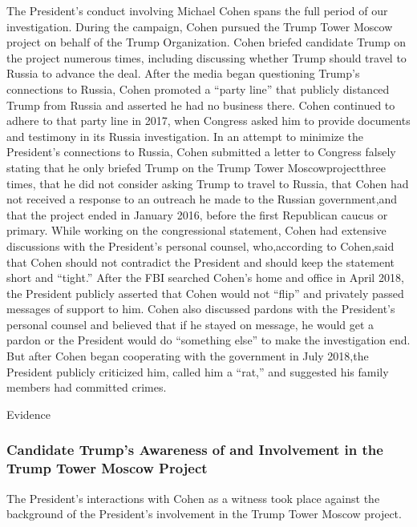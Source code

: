The President's conduct involving Michael Cohen spans the full period of our investigation. During the campaign, Cohen pursued the Trump Tower Moscow project on behalf of the Trump Organization. Cohen briefed candidate Trump on the project numerous times, including discussing whether Trump should travel to Russia to advance the deal. After the media began questioning Trump's connections to Russia, Cohen promoted a “party line” that publicly distanced Trump from Russia and asserted he had no business there. Cohen continued to adhere to that party line in 2017, when Congress asked him to provide documents and testimony in its Russia investigation. In an attempt to minimize the President's connections to Russia, Cohen submitted a letter to Congress falsely stating that he only briefed Trump on the Trump Tower Moscowprojectthree times, that he did not consider asking Trump to travel to Russia, that Cohen had not received a response to an outreach he made to the Russian government,and that the project ended in January 2016, before the first Republican caucus or primary. While working on the congressional statement, Cohen had extensive discussions with the President's personal counsel, who,according to Cohen,said that Cohen should not contradict the President and should keep the statement short and “tight.” After the FBI searched Cohen's home and office in April 2018, the President publicly asserted that Cohen would not “flip” and privately passed messages of support to him. Cohen also discussed pardons with the President's personal counsel and believed that if he stayed on message, he would get a pardon or the President would do “something else” to make
the investigation end. But after Cohen began cooperating with the government in July 2018,the President publicly criticized him, called him a “rat,” and suggested his family members had committed crimes.

Evidence

\subsubsection{Candidate Trump's Awareness of and Involvement in the Trump Tower Moscow Project}

The President's interactions with Cohen as a witness took place against the background of the President's involvement in the Trump Tower Moscow project.

